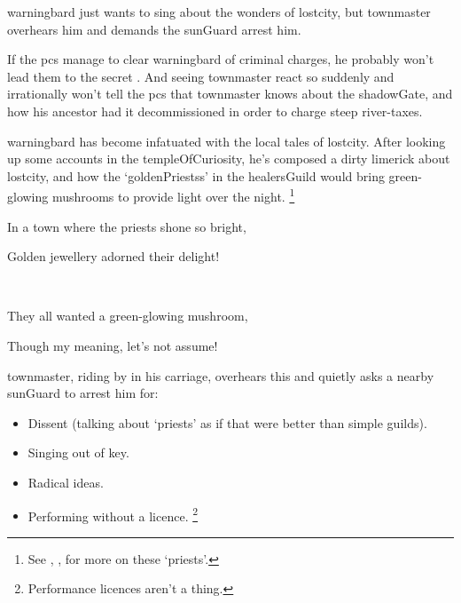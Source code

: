 \Gls{warningbard} just wants to sing about the wonders of \gls{lostcity}, but \gls{townmaster} overhears him and demands the \gls{sunGuard} arrest him.

If the \glspl{pc} manage to clear \gls{warningbard} of criminal charges, he probably won't lead them to the secret .
And seeing \gls{townmaster} react so suddenly and irrationally won't tell the \glspl{pc} that \gls{townmaster} knows about the \gls{shadowGate}, and how his ancestor had it decommissioned in order to charge steep river-taxes.

\begin{exampletext}
  \Gls{warningbard} has become infatuated with the local tales of \gls{lostcity}.
  After looking up some accounts in the \gls{templeOfCuriosity}, he's composed a dirty limerick about \gls{lostcity}, and how the `\glspl{goldenPriests}' in the \gls{healersGuild} would bring green-glowing mushrooms to provide light over the night.%
  \footnote{See , , for more on these `priests'.}
\end{exampletext}

\begin{speechtext}
  In a town where the priests shone so bright,
  \textcolor{\pageSideColor}{\eighthnote~\raisebox{3pt}{\twonotes}}

  \noindent
  Golden jewellery adorned their delight!
  \textcolor{\pageSideColor}{\quarternote\raisebox{-4pt}{\eighthnote~}\eighthnote}

  \textcolor{\pageSideColor}{\twonotes~\raisebox{-12pt}{\twonotes}}

  \noindent
  They all wanted a green-glowing mushroom,
  \textcolor{\pageSideColor}{\eighthnote~\raisebox{2pt}{\quarternote}}

  \noindent
  Though my meaning, let's not assume!
  \textcolor{\pageSideColor}{\eighthnote~\raisebox{-7pt}{\quarternote}}

\end{speechtext}

\Gls{townmaster}, riding by in his carriage, overhears this and quietly asks a nearby \gls{sunGuard} to arrest him for:

\null
\begin{itemize}
  \item
  Dissent (talking about `priests' as if that were better than simple guilds).
  \item
  Singing out of key.
  \item
  Radical ideas.
  \item
  Performing without a licence.%
  \footnote{Performance licences aren't a thing.}
\end{itemize}

